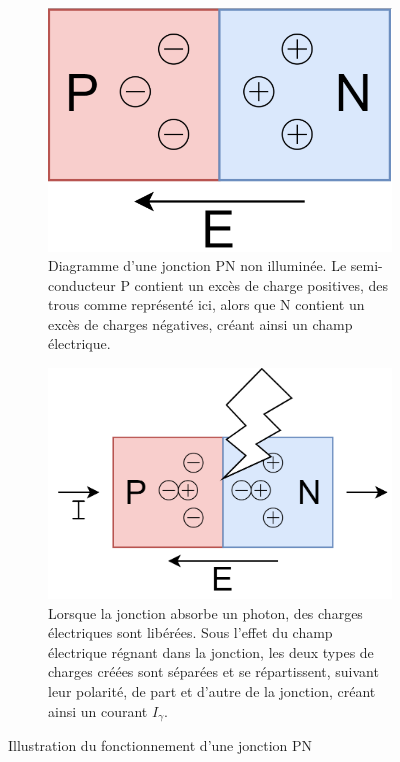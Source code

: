 \begin{figure}
    \centering
    \begin{subfigure}[t]{0.45\linewidth}
        \centering
        \includegraphics[width = 0.6\linewidth]{figures/junction1.png}
        \caption{Diagramme d'une jonction PN non illuminée. Le semi-conducteur P contient un excès de charge positives, des trous comme représenté ici, alors que N contient un excès de charges négatives, créant ainsi un champ électrique.}
    \end{subfigure}
    \hfill
    \begin{subfigure}[t]{0.45\linewidth}
        \centering
        \includegraphics[width = 0.95\linewidth]{figures/junction2.png}
        \caption{Lorsque la jonction absorbe un photon, des charges électriques sont libérées. Sous l'effet du champ électrique régnant dans la jonction, les deux types de charges créées sont séparées et se répartissent, suivant leur
        polarité, de part et d'autre de la jonction, créant ainsi un courant \(I_\gamma\).}
    \end{subfigure}
    \caption{Illustration du fonctionnement d'une jonction PN \cite{nicole}}
    \label{fig:pn}
\end{figure}

